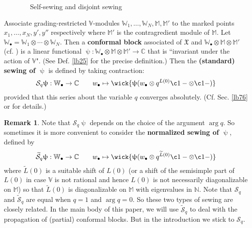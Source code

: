 \documentclass[11pt,b5paper,notitlepage]{article}
\theoremstyle{definition}
\newtheorem{rem}[df]{Remark}
\theoremstyle{plain}
\newcommand{\mc}{\mathcal}
\newcommand{\wtd}{\widetilde}
\newcommand{\blt}{\bullet}
\newcommand{\Vbb}{\mathbb V}
\newcommand{\Wbb}{\mathbb W}
\newcommand{\Mbb}{\mathbb M}
\newcommand{\Cbb}{\mathbb C}
\newcommand{\Nbb}{\mathbb N}
\newcommand{\<}{\left\langle}
\renewcommand{\>}{\right\rangle}
\newcommand{\fx}{\mathfrak{X}}
\numberwithin{equation}{section}
\begin{document}
\begin{figure}[h]
{


}
	\caption{~~Self-sewing and disjoint sewing}
	\label{fig2}
\end{figure}

Associate grading-restricted $\Vbb$-modules $\Wbb_1,\dots,\Wbb_N,\Mbb,\Mbb'$ to the marked points $x_1,\dots,x_N,y',y''$ respectively where $\Mbb'$ is the contragredient module of $\Mbb$. Let $\Wbb_\blt=\Wbb_1\otimes\cdots\otimes\Wbb_N$. Then a \textbf{conformal block} associated of $\fx$ and $\Wbb_\blt\otimes\Mbb\otimes\Mbb'$ (cf. \cite{Zhu-global,FB04}) is a linear functional $\uppsi:\Wbb_\blt\otimes\Mbb\otimes\Mbb'\rightarrow\Cbb$ that is ``invariant under the action of $\Vbb$". (See Def. \ref{lb25} for the precise definition.) Then the \textbf{(standard) sewing of $\uppsi$} is defined by taking contraction:
\begin{gather}
\mc S_q\uppsi:\Wbb_\blt\rightarrow\Cbb\qquad w_\blt\mapsto \wick{\uppsi(w_\blt\otimes q^{L(0)}\c1-\otimes \c1-)}
\end{gather}
provided that this series about the variable $q$ converges absolutely. (Cf. Sec. \ref{lb76} or \cite[Sec. 10]{Gui-sewingconvergence} for details.)

\begin{rem}
Note that $\mc S_q\uppsi$ depends on the choice of the argument $\arg q$. So sometimes it is more convenient to consider the \textbf{normalized sewing of $\uppsi$}, defined by
\begin{gather}
\wtd{\mc S}_q\uppsi:\Wbb_\blt\rightarrow\Cbb\qquad w_\blt\mapsto \wick{\uppsi(w_\blt\otimes q^{\wtd L(0)}\c1-\otimes \c1-)}
\end{gather}
where $\wtd L(0)$ is a suitable shift of $L(0)$ (or a shift of the semisimple part of $L(0)$ in case $\Vbb$ is not rational and hence $L(0)$ is not necessarily diagonalizable on $\Mbb$) so that $\wtd L(0)$ is diagonalizable on $\Mbb$ with eigenvalues in $\Nbb$. Note that $\mc S_q$ and $\wtd{\mc S}_q$ are equal when $q=1$ and $\arg q=0$. So these two types of sewing are closely related. In the main body of this paper, we will use $\wtd{\mc S}_q$ to deal with the propagation of (partial) conformal blocks. But in the introduction we stick to $\mc S_q$.
\end{rem}
\end{document}
